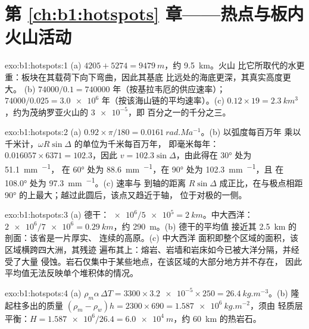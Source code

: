 \section*{第 \ref{ch:b1:hotspots} 章——热点与板内火山活动}

\begin{solution}{exo:b1:hotspots:1}
(a) $4205 + 5274 = \qty{9479}{m}$，约 \qty{9.5}{km}。火山
比它所取代的水更重：板块在其载荷下向下弯曲，因此其基底
比远处的海底更深，其真实高度更大。
(b) $74000/0.1 = \num{740000}$ 年（按基拉韦厄的供应速率）；
$74000/0.025 = \num{3.0e6}$ 年（按该海山链的平均速率）。(c)
$0.12\times19 = \qty{2.3}{km^3}$，约为茂纳罗亚火山的 $\num{3e-5}$，即
百分之一的千分之三。
\end{solution}

\begin{solution}{exo:b1:hotspots:2}
(a) $0.92\times\pi/180 = \qty{0.0161}{rad.Ma^{-1}}$。(b) 以弧度每百万年
乘以千米计，$\omega R\sin\Delta$ 的单位为千米每百万年，
即毫米每年：$0.016057\times6371 = 102.3$，因此
$v = 102.3\sin\Delta$，由此得在 \ang{30} 处为 \qty{51.1}{mm.^{-1}}，
在 \ang{60} 处为 \qty{88.6}{mm.^{-1}}，在 \ang{90} 处为 \qty{102.3}{mm.^{-1}}，且
在 \ang{108.0} 处为 \qty{97.3}{mm.^{-1}}。(c) 速率与
到轴的距离 $R\sin\Delta$ 成正比，在与极点相距 \ang{90}
的上最大；越过此圆后，该点又趋近于轴，
位于对极的一侧。
\end{solution}

\begin{solution}{exo:b1:hotspots:3}
(a) 德干：$\num{e6}/\num{5e5} = \qty{2}{km}$。中大西洋：
$\num{2e6}/\num{7e6} = \qty{0.29}{km}$，约 \qty{290}{m}。(b) 德干的平均值
接近其 \qty{2.5}{km} 的剖面：该省是一片厚实、
连续的高原。(c) 中大西洋
面积即整个区域的面积，该区域横跨四大洲，其残迹
遍布其上：熔岩、岩墙和岩床如今已被大洋分隔，并经受了大量
侵蚀。岩石仅集中于某些地点，在该区域的大部分地方并不存在，
因此平均值无法反映单个堆积体的情况。
\end{solution}

\begin{solution}{exo:b1:hotspots:4}
(a) $\rho_m\alpha\,\Delta T = 3300\times\num{3.2e-5}\times250 =
\qty{26.4}{kg.m^{-3}}$。(b) 隆起柱多出的质量
$(\rho_m - \rho_w)h = 2300\times690 = \qty{1.587e6}{kg.m^{-2}}$，须由
轻质层平衡：$H = \num{1.587e6}/26.4 = \qty{6.0e4}{m}$，约
\qty{60}{km} 的热岩石。
\end{solution}


